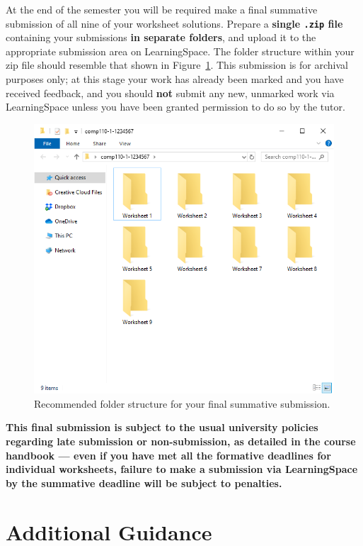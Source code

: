 \documentclass{../../fal_assignment}
\begin{document}
At the end of the semester you will be required make a final summative submission of all nine of your worksheet solutions.
Prepare a \textbf{single \texttt{.zip} file} containing your submissions \textbf{in separate folders}, and upload it to the appropriate submission area on LearningSpace. The folder structure within your zip file should resemble that shown in Figure~\ref{fig:folder_structure}.
This submission is for archival purposes only; at this stage your work has already been marked and you have received feedback, and you should \textbf{not} submit any new, unmarked work via LearningSpace unless you have been granted permission to do so by the tutor.
\begin{figure}
    \begin{center}
        \includegraphics[height=0.4\textheight]{folder_structure}
    \end{center}
    \caption{Recommended folder structure for your final summative submission.}
    \label{fig:folder_structure}
\end{figure}

\textbf{This final submission is subject to the usual university policies regarding late submission or non-submission,
as detailed in the course handbook ---
even if you have met all the formative deadlines for individual worksheets,
failure to make a submission via LearningSpace by the summative deadline will be subject to penalties.}

\section*{Additional Guidance}
\end{document}
